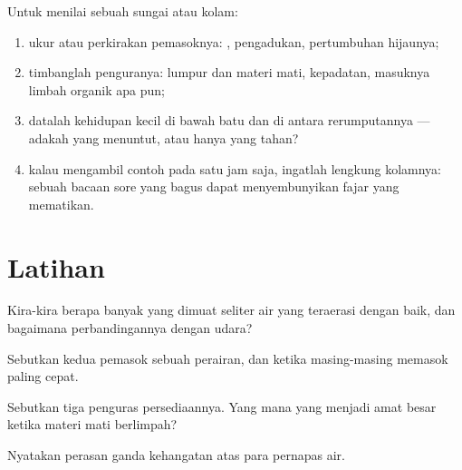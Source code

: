 \begin{method}\label{met:g7:oxygen-in-the-water:judge}
Untuk menilai sebuah sungai atau kolam:
\begin{enumerate}
  \item ukur atau perkirakan pemasoknya: , pengadukan, pertumbuhan
        hijaunya;
  \item timbanglah penguranya: lumpur dan materi mati, kepadatan,
        masuknya limbah organik apa pun;
  \item datalah kehidupan kecil di bawah batu dan di antara
        rerumputannya --- adakah  yang menuntut, atau hanya
        yang tahan?
  \item kalau mengambil contoh pada satu jam saja, ingatlah lengkung
        kolamnya: sebuah bacaan sore yang bagus dapat menyembunyikan
        fajar yang mematikan.
\end{enumerate}
\end{method}

\section{Latihan}

\begin{exercise}[$\star$]\label{exo:g7:oxygen-in-the-water:1}
Kira-kira berapa banyak  yang dimuat seliter air yang teraerasi
dengan baik, dan bagaimana perbandingannya dengan udara?
\end{exercise}

\begin{exercise}[$\star$]\label{exo:g7:oxygen-in-the-water:2}
Sebutkan kedua pemasok  sebuah perairan, dan  ketika
masing-masing memasok paling cepat.
\end{exercise}

\begin{exercise}[$\star$]\label{exo:g7:oxygen-in-the-water:3}
Sebutkan tiga penguras persediaannya. Yang mana yang menjadi amat
besar ketika materi mati berlimpah?
\end{exercise}

\begin{exercise}[$\star$]\label{exo:g7:oxygen-in-the-water:4}
Nyatakan perasan ganda kehangatan atas para pernapas air.
\end{exercise}

